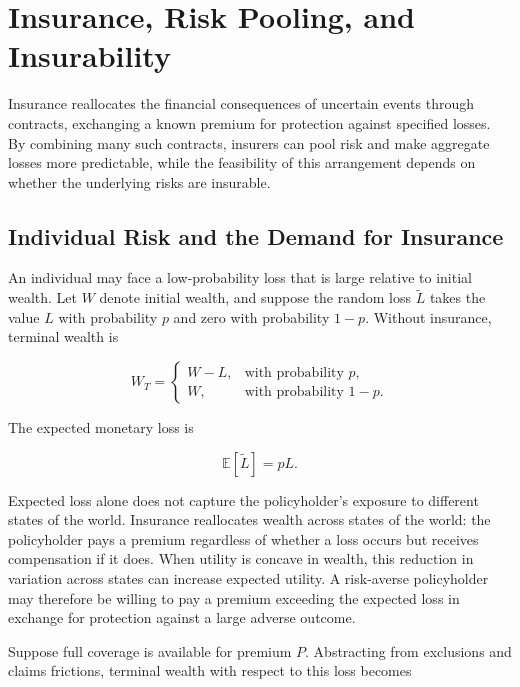 \section{Insurance, Risk Pooling, and Insurability}

Insurance reallocates the financial consequences of uncertain events through contracts, exchanging a known premium for protection against specified losses. By combining many such contracts, insurers can pool risk and make aggregate losses more predictable, while the feasibility of this arrangement depends on whether the underlying risks are insurable.

\subsection{Individual Risk and the Demand for Insurance}

An individual may face a low-probability loss that is large
relative to initial wealth. Let $W$ denote initial wealth,
and suppose the random loss $\tilde{L}$ takes the value $L$
with probability $p$ and zero with probability $1-p$.
Without insurance, terminal wealth is

\begin{equation}
W_T=
\begin{cases}
W-L, & \text{with probability } p,\\
W, & \text{with probability } 1-p.
\end{cases}
\label{eq:ch15-uninsured-wealth}
\end{equation}

The expected monetary loss is

\begin{equation}
\mathbb{E}[\tilde{L}]=pL.
\label{eq:ch15-expected-loss-simple}
\end{equation}

Expected loss alone does not capture the policyholder's
exposure to different states of the world. Insurance reallocates wealth across states of the world:
the policyholder pays a premium regardless of whether a
loss occurs but receives compensation if it does. When utility is concave in wealth, this reduction
in variation across states can increase expected utility.
A risk-averse policyholder may therefore be willing to
pay a premium exceeding the expected loss in exchange
for protection against a large adverse outcome.

Suppose full coverage is available for premium $P$. Abstracting from exclusions and claims frictions, terminal wealth with respect to this loss becomes

